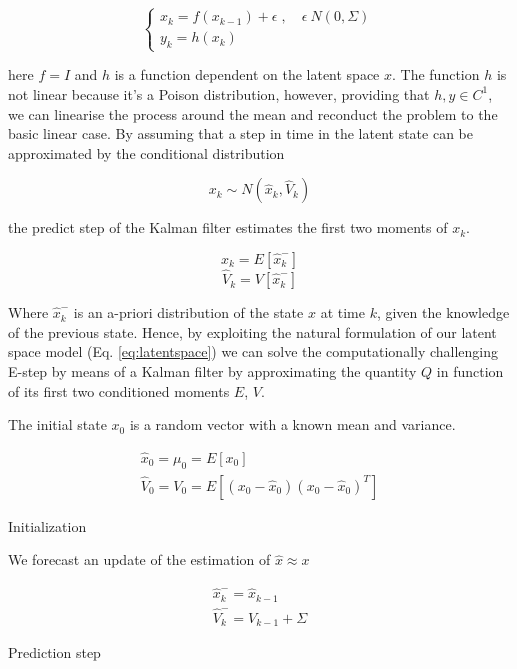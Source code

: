 \documentclass[mscthesis]{usiinfthesis}
\begin{document}
\begin{eqfloat}
\begin{equation}
    \begin{cases}
      x_k = f(x_{k-1}) + \epsilon \; , \quad \epsilon ~ N(0, \Sigma) \\
      y_k = h(x_k) 
    \end{cases}\,
\label{eq:latentspace2}
\end{equation}
\end{eqfloat}

here $f = I$ and $h$ is a function dependent on the latent space $x$. The function $h$ is not linear because it's a Poison distribution, however, providing that $h, y \in C^1$, we can linearise the process around the mean and reconduct the problem to the basic linear case. By assuming that a step in time in the latent state can be approximated by the conditional distribution 

\[
x_{k} \sim N( \hat{x}_k, \hat{V}_k)
\]

the predict step of the Kalman filter estimates the first two moments of $x_k$. 

\[
\hat{x}_k = E[\hat{x}^-_k]
\]
\[
\hat{V}_k = V[\hat{x}^-_k]
\]

Where $\hat{x}^-_k$  is an a-priori distribution of the state $x$ at time $k$, given the knowledge of the previous state. Hence, by exploiting the natural formulation of our latent space model (Eq. \ref{eq:latentspace}) we can solve the computationally challenging E-step by means of a Kalman filter by approximating the quantity $Q$ in function of its first two conditioned moments $E$, $V$. 

The initial state $x_0$ is a random vector with a known mean and variance.

\begin{eqfloat}
\begin{equation}
\begin{array}{l}
\hat{x}_0 = \mu_0 = E[x_0] \\
\hat{V}_0 = V_0 = E[(x_0-\hat{x}_0)(x_0-\hat{x}_0)^T] 
\end{array}
\label{eq:kalman_init}
\end{equation}
\caption{Initialization}
\end{eqfloat}

We forecast an update of the estimation of $\hat{x} \approx x$

\begin{eqfloat}[H]
\begin{equation}
\begin{array}{l}
\hat{x}_k^- = \hat{x}_{k-1} \\
\hat{V}_k^- =  V_{k-1} + \Sigma
\end{array}
\end{equation}
\caption{Prediction step}
\label{eq:ext_kalmann_prediction}
\end{eqfloat}
\end{document}
